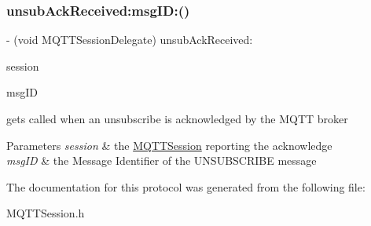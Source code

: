 \subsubsection{\texorpdfstring{unsub\+Ack\+Received\+:msg\+I\+D\+:()}{unsubAckReceived:msgID:()}}
{\footnotesize\ttfamily -\/ (void M\+Q\+T\+T\+Session\+Delegate) unsub\+Ack\+Received\+: \begin{DoxyParamCaption}\item[{(\hyperlink{interface_m_q_t_t_session}{M\+Q\+T\+T\+Session} $\ast$)}]{session }\item[{msgID:(U\+Int16)}]{msg\+ID }\end{DoxyParamCaption}\hspace{0.3cm}{\ttfamily [optional]}}

gets called when an unsubscribe is acknowledged by the M\+Q\+TT broker 
\begin{DoxyParams}{Parameters}
{\em session} & the \hyperlink{interface_m_q_t_t_session}{M\+Q\+T\+T\+Session} reporting the acknowledge \\
\hline
{\em msg\+ID} & the Message Identifier of the U\+N\+S\+U\+B\+S\+C\+R\+I\+BE message \\
\hline
\end{DoxyParams}


The documentation for this protocol was generated from the following file\+:\begin{DoxyCompactItemize}
\item 
M\+Q\+T\+T\+Session.\+h\end{DoxyCompactItemize}
